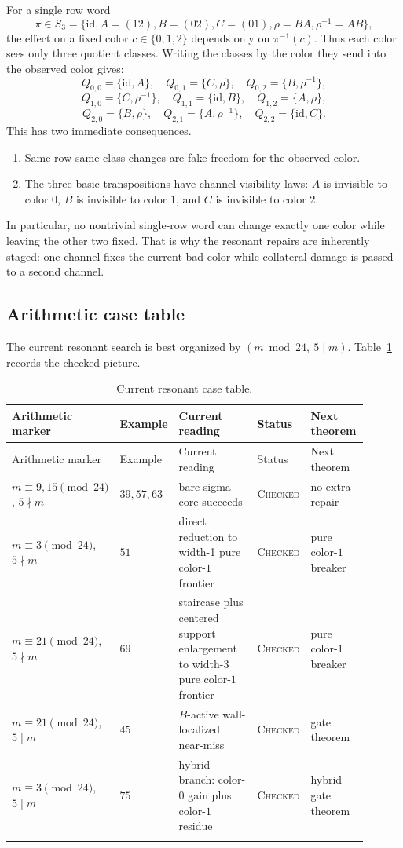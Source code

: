 \documentclass[11pt]{article}
\newcommand{\status}[1]{\textsc{#1}}
\begin{document}
For a single row word
\[
\pi\in S_3=\{\mathrm{id},A=(12),B=(02),C=(01),\rho=BA,\rho^{-1}=AB\},
\]
the effect on a fixed color $c\in\{0,1,2\}$ depends only on
\(\pi^{-1}(c)\).
Thus each color sees only three quotient classes.
Writing the classes by the color they send into the observed color gives:
\[
Q_{0,0}=\{\mathrm{id},A\},\quad Q_{0,1}=\{C,\rho\},\quad Q_{0,2}=\{B,\rho^{-1}\},
\]
\[
Q_{1,0}=\{C,\rho^{-1}\},\quad Q_{1,1}=\{\mathrm{id},B\},\quad Q_{1,2}=\{A,\rho\},
\]
\[
Q_{2,0}=\{B,\rho\},\quad Q_{2,1}=\{A,\rho^{-1}\},\quad Q_{2,2}=\{\mathrm{id},C\}.
\]
This has two immediate consequences.

\begin{enumerate}[label=\textup{(\arabic*)},leftmargin=2.8em]
\item Same-row same-class changes are fake freedom for the observed color.
\item The three basic transpositions have channel visibility laws:
      \(A\) is invisible to color $0$, \(B\) is invisible to color $1$,
      and \(C\) is invisible to color $2$.
\end{enumerate}

In particular, no nontrivial single-row word can change exactly one color while
leaving the other two fixed.
That is why the resonant repairs are inherently staged: one channel fixes the
current bad color while collateral damage is passed to a second channel.

\subsection{Arithmetic case table}

The current resonant search is best organized by
\((m\bmod 24,\ 5\mid m)\).
Table~\ref{tab:resonant-cases} records the checked picture.

\begin{longtable}{p{0.17\linewidth}p{0.10\linewidth}p{0.31\linewidth}p{0.15\linewidth}p{0.17\linewidth}}
\toprule
Arithmetic marker & Example & Current reading & Status & Next theorem \\
\midrule
\endfirsthead
\toprule
Arithmetic marker & Example & Current reading & Status & Next theorem \\
\midrule
\endhead
$m\equiv 9,15\pmod{24}$, $5\nmid m$ & $39,57,63$ & bare sigma-core succeeds & \status{Checked} & no extra repair \\
$m\equiv 3\pmod{24}$, $5\nmid m$ & $51$ & direct reduction to width-1 pure color-$1$ frontier & \status{Checked} & pure color-$1$ breaker \\
$m\equiv 21\pmod{24}$, $5\nmid m$ & $69$ & staircase plus centered support enlargement to width-3 pure color-$1$ frontier & \status{Checked} & pure color-$1$ breaker \\
$m\equiv 21\pmod{24}$, $5\mid m$ & $45$ & $B$-active wall-localized near-miss & \status{Checked} & gate theorem \\
$m\equiv 3\pmod{24}$, $5\mid m$ & $75$ & hybrid branch: color-$0$ gain plus color-$1$ residue & \status{Checked} & hybrid gate theorem \\
\bottomrule
\caption{Current resonant case table.}
\label{tab:resonant-cases}
\end{longtable}
\end{document}
